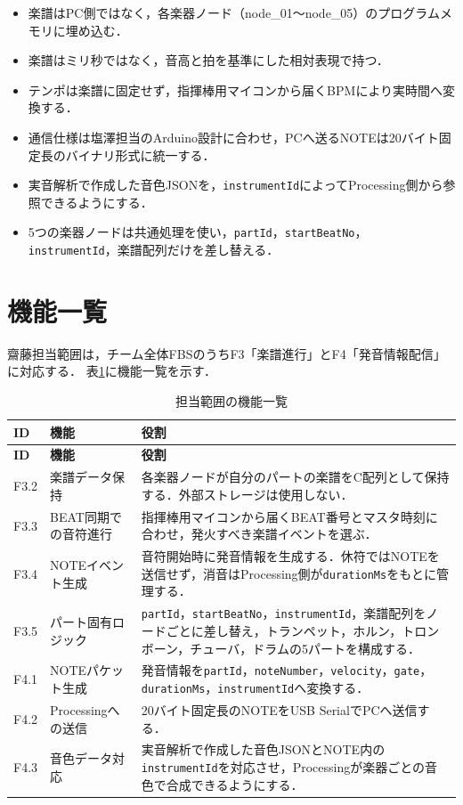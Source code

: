 \documentclass[lualatex,book,paper=a4paper,jafontsize=11.5pt,jafontscale=1.05]{jlreq}
\newcommand{\code}[1]{\texttt{#1}}
\begin{document}
\begin{itemize}
  \item 楽譜はPC側ではなく，各楽器ノード（node\_01〜node\_05）のプログラムメモリに埋め込む．
  \item 楽譜はミリ秒ではなく，音高と拍を基準にした相対表現で持つ．
  \item テンポは楽譜に固定せず，指揮棒用マイコンから届くBPMにより実時間へ変換する．
  \item 通信仕様は塩澤担当のArduino設計に合わせ，PCへ送るNOTEは20バイト固定長のバイナリ形式に統一する．
  \item 実音解析で作成した音色JSONを，\code{instrumentId}によってProcessing側から参照できるようにする．
  \item 5つの楽器ノードは共通処理を使い，\code{partId}，\code{startBeatNo}，\code{instrumentId}，楽譜配列だけを差し替える．
\end{itemize}

\section{機能一覧}

齋藤担当範囲は，チーム全体FBSのうちF3「楽譜進行」とF4「発音情報配信」に対応する．
表\ref{tab:saito-functions}に機能一覧を示す．

\begin{longtable}{p{}p{}p{}}
\caption{担当範囲の機能一覧}\label{tab:saito-functions}\\
\toprule
\textbf{ID} & \textbf{機能} & \textbf{役割} \\
\midrule
\endfirsthead
\toprule
\textbf{ID} & \textbf{機能} & \textbf{役割} \\
\midrule
\endhead
F3.2 & 楽譜データ保持 &
各楽器ノードが自分のパートの楽譜をC配列として保持する．外部ストレージは使用しない．\\
F3.3 & BEAT同期での音符進行 &
指揮棒用マイコンから届くBEAT番号とマスタ時刻に合わせ，発火すべき楽譜イベントを選ぶ．\\
F3.4 & NOTEイベント生成 &
音符開始時に発音情報を生成する．休符ではNOTEを送信せず，消音はProcessing側が\code{durationMs}をもとに管理する．\\
F3.5 & パート固有ロジック &
\code{partId}，\code{startBeatNo}，\code{instrumentId}，楽譜配列をノードごとに差し替え，トランペット，ホルン，トロンボーン，チューバ，ドラムの5パートを構成する．\\
F4.1 & NOTEパケット生成 &
発音情報を\code{partId}，\code{noteNumber}，\code{velocity}，\code{gate}，
\code{durationMs}，\code{instrumentId}へ変換する．\\
F4.2 & Processingへの送信 &
20バイト固定長のNOTEをUSB SerialでPCへ送信する．\\
F4.3 & 音色データ対応 &
実音解析で作成した音色JSONとNOTE内の\code{instrumentId}を対応させ，Processingが楽器ごとの音色で合成できるようにする．\\
\bottomrule
\end{longtable}
\end{document}

